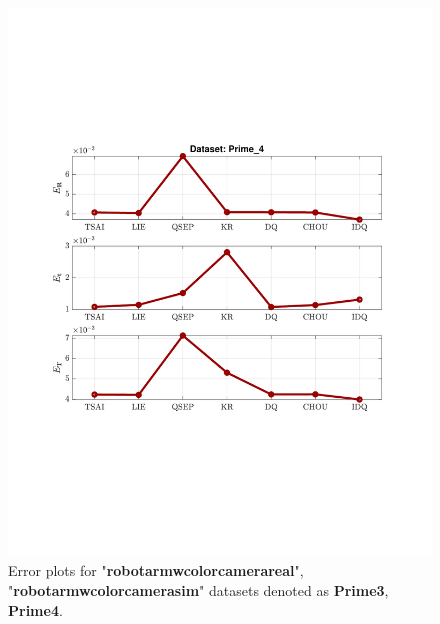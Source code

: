 \begin{figure}
\includegraphics[scale=0.7]{./hand_eye_figures/real/Result_Prime_4}
\caption{Error plots for "\textbf{robot{\textunderscore}arm{\textunderscore}w{\textunderscore}color{\textunderscore}camera{\textunderscore}real}", "\textbf{robot{\textunderscore}arm{\textunderscore}w{\textunderscore}color{\textunderscore}camera{\textunderscore}sim}" datasets denoted as \textbf{Prime{\textunderscore}3}, \textbf{Prime{\textunderscore}4}.}
\end{figure}

